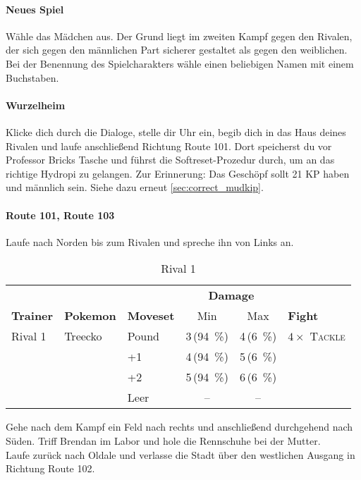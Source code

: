 \documentclass[11pt,a4paper,titlepage]{article}
\begin{document}
\paragraph{Neues Spiel}
Wähle das Mädchen aus. Der Grund liegt im zweiten Kampf gegen den Rivalen, der sich gegen den männlichen Part sicherer gestaltet als gegen den weiblichen. Bei der Benennung des Spielcharakters wähle einen beliebigen Namen mit einem Buchstaben.
\paragraph{Wurzelheim}
Klicke dich durch die Dialoge, stelle dir Uhr ein, begib dich in das Haus deines Rivalen und laufe anschließend Richtung Route 101. Dort speicherst du vor Professor Bricks Tasche und führst die Softreset-Prozedur durch, um an das richtige Hydropi zu gelangen. Zur Erinnerung: Das Geschöpf sollt 21 KP haben und  männlich sein. Siehe dazu erneut \ref{sec:correct_mudkip}.
\paragraph{Route 101, Route 103}
Laufe nach Norden bis zum Rivalen und spreche ihn von Links an.
\begin{table}[htbp]
	\caption{Rival 1}
	\centering
	\begin{tabular}{lllccl}
		\toprule 
		&&&\multicolumn{2}{c}{\textbf{Damage}}\\
		\cmidrule(rl){4-5}
		\textbf{Trainer}&\textbf{Pokemon}&\textbf{Moveset}&Min&Max&\textbf{Fight}\\ 
		\midrule
		Rival 1&Treecko&Pound&3\,(\SI{94}{\percent})&4\,(\SI{6}{\percent})&$4 \times$ \textsc{Tackle}\\
		&&+1&4\,(\SI{94}{\percent})&5\,(\SI{6}{\percent})\\
		&&+2&5\,(\SI{94}{\percent})&6\,(\SI{6}{\percent})\\
		&&Leer&--&--\\ 
		\bottomrule
	\end{tabular}
\end{table}
Gehe nach dem Kampf ein Feld nach rechts und anschließend durchgehend nach Süden. Triff Brendan im Labor und hole die Rennschuhe bei der Mutter.\\
Laufe zurück nach Oldale und verlasse die Stadt über den westlichen Ausgang in Richtung Route 102.
\end{document}
